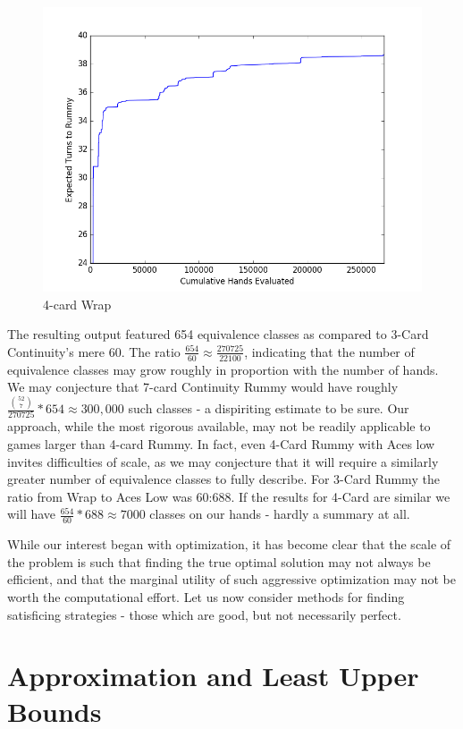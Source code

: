\documentclass[letter,12pt]{article}
\begin{document}
\begin{figure}
\includegraphics[width=\textwidth]{fig3.png}
\caption{4-card Wrap}\label{fig:3}
\end{figure}

The resulting output featured 654 equivalence classes as compared to 3-Card Continuity's mere 60. The ratio $\frac{654}{60} \approx \frac{270725}{22100}$, indicating that the number of equivalence classes may grow roughly in proportion with the number of hands. We may conjecture that 7-card Continuity Rummy would have roughly $\frac{\binom{52}{7}}{270725} * 654 \approx 300,000$ such classes - a dispiriting estimate to be sure. Our approach, while the most rigorous available, may not be readily applicable to games larger than 4-card Rummy. In fact, even 4-Card Rummy with Aces low invites difficulties of scale, as we may conjecture that it will require a similarly greater number of equivalence classes to fully describe. For 3-Card Rummy the ratio from Wrap to Aces Low was 60:688. If the results for 4-Card are similar we will have $\frac{654}{60} * 688 \approx 7000$ classes on our hands - hardly a summary at all.

While our interest began with optimization, it has become clear that the scale of the problem is such that finding the true optimal solution may not always be efficient, and that the marginal utility of such aggressive optimization may not be worth the computational effort. Let us now consider methods for finding satisficing strategies - those which are good, but not necessarily perfect.

\section{Approximation and Least Upper Bounds}
\end{document}
